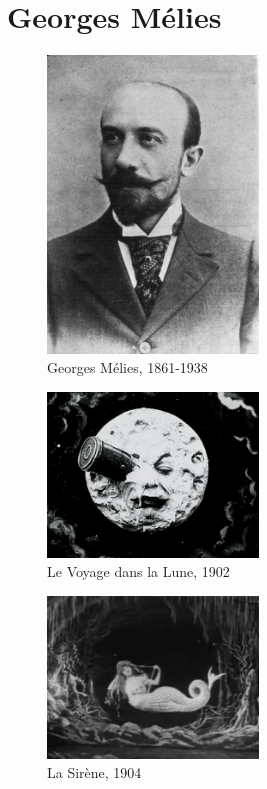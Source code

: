 \documentclass[
  french,
]{book}
\begin{document}
\hypertarget{georges-muxe9lies}{%
\section{Georges Mélies}\label{georges-muxe9lies}}

\begin{figure}
\centering
\includegraphics[width=0.5\textwidth,height=\textheight]{medias/corpus/melies/George_Melies.jpg}
\caption{Georges Mélies, 1861-1938}
\end{figure}

\begin{figure}
\centering
\includegraphics[width=0.5\textwidth,height=\textheight]{medias/corpus/melies/voyage_dans_la_lune.gif}
\caption{Le Voyage dans la Lune, 1902}
\end{figure}

\begin{figure}
\centering
\includegraphics[width=0.5\textwidth,height=\textheight]{medias/corpus/melies/sirene_1904.gif}
\caption{La Sirène, 1904}
\end{figure}
\end{document}
